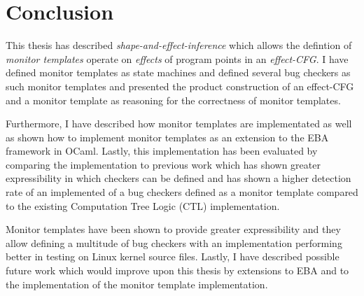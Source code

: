\section{Conclusion}

This thesis has described \textit{shape-and-effect-inference} which allows the defintion of \textit{monitor templates} operate on \textit{effects} of program points in an \textit{effect-CFG}. I have defined monitor templates as state machines and defined several bug checkers as such monitor templates and presented the product construction of an effect-CFG and a monitor template as reasoning for the correctness of monitor templates. 

\newpar Furthermore, I have described how monitor templates are implementated as well as shown how to implement monitor templates as an extension to the EBA framework in OCaml. Lastly, this implementation has been evaluated by comparing the implementation to previous work which has shown greater expressibility in which checkers can be defined and has shown a higher detection rate of an implemented of a bug checkers defined as a monitor template compared to the existing Computation Tree Logic (CTL) implementation. 

\newpar Monitor templates have been shown to provide greater expressibility and they allow defining a multitude of bug checkers with an implementation performing better in testing on Linux kernel source files. Lastly, I have described possible future work which would improve upon this thesis by extensions to EBA and to the implementation of the monitor template implementation. 